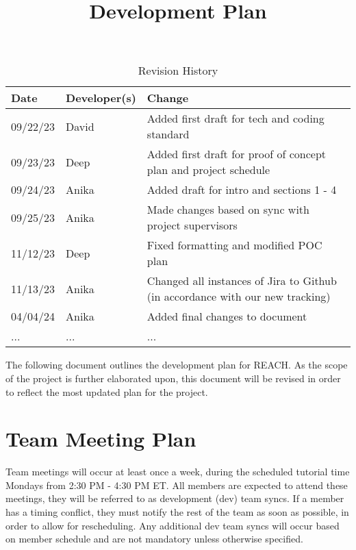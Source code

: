 \documentclass{article}
\title{Development Plan\\\progname}
\author{\authname}
\date{}
\begin{document}
\maketitle

\begin{table}[hp]
	\caption{Revision History} \label{TblRevisionHistory}
	\begin{tabularx}{\textwidth}{llX}
		\toprule
		\textbf{Date} & \textbf{Developer(s)} & \textbf{Change}                                                               \\
		\midrule
		09/22/23      & David                 & Added first draft for tech and coding standard                                \\
		09/23/23      & Deep                  & Added first draft for proof of concept plan and project schedule              \\
		09/24/23      & Anika                 & Added draft for intro and sections 1 - 4                                      \\
		09/25/23      & Anika                 & Made changes based on sync with project supervisors                           \\
		11/12/23      & Deep                  & Fixed formatting and modified POC plan                                        \\
		11/13/23      & Anika                 & Changed all instances of Jira to Github (in accordance with our new tracking) \\
		04/04/24      & Anika                 & Added final changes to document                                               \\
		...           & ...                   & ...                                                                           \\
		\bottomrule
	\end{tabularx}
\end{table}

\noindent The following document outlines the development plan for REACH.
As the scope of the project is further elaborated upon,
this document will be revised in order to reflect the most updated plan for the project.

\section{Team Meeting Plan}
Team meetings will occur at least once a week, during the scheduled tutorial time Mondays from 2:30 PM - 4:30 PM ET.
All members are expected to attend these meetings, they will be referred to as development (dev) team syncs.
If a member has a timing conflict, they must notify the rest of the team as soon as possible, in order to allow for rescheduling.
Any additional dev team syncs will occur based on member schedule and are not mandatory unless otherwise specified.
\end{document}
